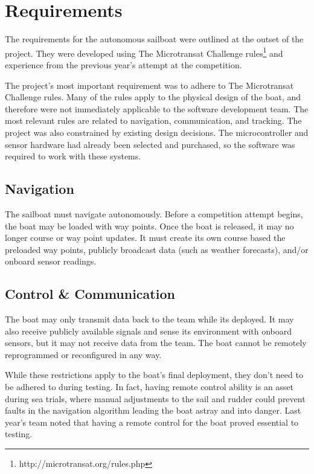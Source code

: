 \documentclass[12pt]{article}
\begin{document}
\clearpage

\section{Requirements}
The requirements for the autonomous sailboat were outlined at the outset of the project. They were developed using The Microtransat Challenge rules\footnote{http://microtransat.org/rules.php} and experience from the previous year's attempt at the competition. 

The project's most important requirement was to adhere to The Microtransat Challenge rules. Many of the rules apply to the physical design of the boat, and therefore were not immediately applicable to the software development team. The most relevant rules are related to navigation, communication, and tracking. The project was also constrained by existing design decisions. The microcontroller and sensor hardware had already been selected and purchased, so the software was required to work with these systems. 

\subsection{Navigation}
The sailboat must navigate autonomously. Before a competition attempt begins, the boat may be loaded with way points. Once the boat is released, it may no longer course or way point updates. It must create its own course based the preloaded way points, publicly broadcast data (such as weather forecasts), and/or onboard sensor readings.

\subsection{Control \& Communication}
The boat may only transmit data back to the team while its deployed. It may also receive publicly available signals and sense its environment with onboard sensors, but it may not receive data from the team. The boat cannot be remotely reprogrammed or reconfigured in any way. 

While these restrictions apply to the boat's final deployment, they don't need to be adhered to during testing. In fact, having remote control ability is an asset during sea trials, where manual adjustments to the sail and rudder could prevent faults in the navigation algorithm leading the boat astray and into danger. Last year's team noted that having a remote control for the boat proved essential to testing.
\end{document}

